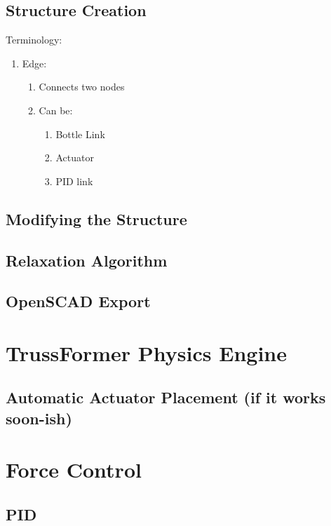 \subsection{Structure Creation}
Terminology:\\
\begin{enumerate}
    \item Edge:
    \begin{enumerate}
        \item Connects two nodes
        \item Can be:
        \begin{enumerate}
            \item Bottle Link
            \item Actuator
            \item PID link
        \end{enumerate}
    \end{enumerate}
\end{enumerate}

\subsection{Modifying the Structure}

\subsection{Relaxation Algorithm}\label{sec:relaxation}

\subsection{OpenSCAD Export}\label{sec:openscad_impl}

\section{TrussFormer Physics Engine}

\subsection{Automatic Actuator Placement (if it works soon-ish)}

\section{Force Control}

\subsection{PID}
